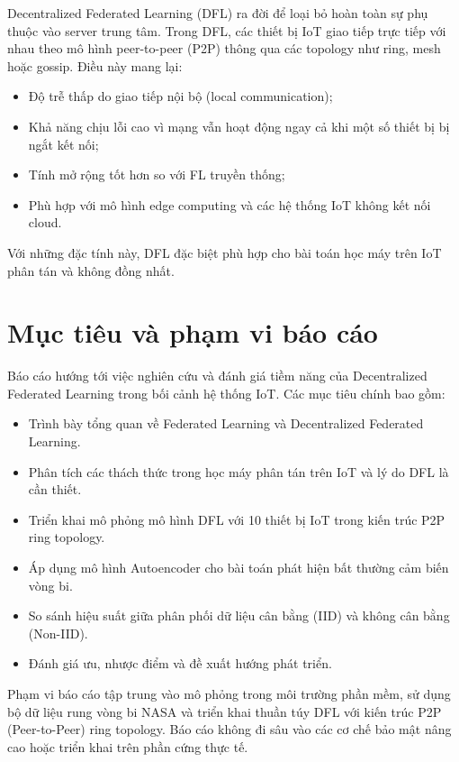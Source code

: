 Decentralized Federated Learning (DFL) ra đời để loại bỏ hoàn toàn sự phụ thuộc vào server trung tâm. Trong DFL, các thiết bị IoT giao tiếp trực tiếp với nhau theo mô hình peer-to-peer (P2P) thông qua các topology như ring, mesh hoặc gossip. Điều này mang lại:

\begin{itemize}
    \item Độ trễ thấp do giao tiếp nội bộ (local communication);
    \item Khả năng chịu lỗi cao vì mạng vẫn hoạt động ngay cả khi một số thiết bị bị ngắt kết nối;
    \item Tính mở rộng tốt hơn so với FL truyền thống;
    \item Phù hợp với mô hình edge computing và các hệ thống IoT không kết nối cloud.
\end{itemize}

Với những đặc tính này, DFL đặc biệt phù hợp cho bài toán học máy trên IoT phân tán và không đồng nhất.

\section{Mục tiêu và phạm vi báo cáo}

\hspace{0.6cm}Báo cáo hướng tới việc nghiên cứu và đánh giá tiềm năng của Decentralized Federated Learning trong bối cảnh hệ thống IoT. Các mục tiêu chính bao gồm:

\begin{itemize}
    \item Trình bày tổng quan về Federated Learning và Decentralized Federated Learning.
    \item Phân tích các thách thức trong học máy phân tán trên IoT và lý do DFL là cần thiết.
    \item Triển khai mô phỏng mô hình DFL với 10 thiết bị IoT trong kiến trúc P2P ring topology.
    \item Áp dụng mô hình Autoencoder cho bài toán phát hiện bất thường cảm biến vòng bi.
    \item So sánh hiệu suất giữa phân phối dữ liệu cân bằng (IID) và không cân bằng (Non-IID).
    \item Đánh giá ưu, nhược điểm và đề xuất hướng phát triển.
\end{itemize}

Phạm vi báo cáo tập trung vào mô phỏng trong môi trường phần mềm, sử dụng bộ dữ liệu rung vòng bi NASA và triển khai thuần túy DFL với kiến trúc P2P (Peer-to-Peer) ring topology. Báo cáo không đi sâu vào các cơ chế bảo mật nâng cao hoặc triển khai trên phần cứng thực tế.

